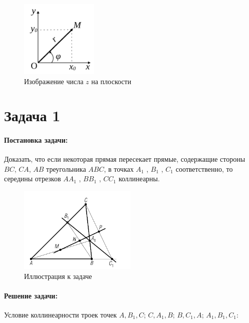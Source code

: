 \begin{figure}[ht]
    \centering
    \includegraphics[width=0.33\textwidth]{images/img1}
    \caption{Изображение числа \(z\) на плоскости}
    \label{img1}
\end{figure}
\section*{Задача 1}
\paragraph{Постановка задачи:}
Доказать, что если некоторая прямая пересекает прямые, содержащие стороны \(BC\), \(CA\), \(AB\) треугольника \(ABC\), в точках \(A_1\) , \(B_1\) , \(C_1\) соответственно, то середины отрезков \(AA_1\) , \(BB_1\) , \(CC_1\) коллинеарны.
\begin{figure}[h]
    \centering
    \includegraphics[width=0.5\textwidth]{images/task1.png}
    \caption{Иллюстрация к задаче}
    \label{task1}
\end{figure}
\paragraph{Решение задачи:}
Условие коллинеарности троек точек \(A, B_1 , C\); \(C,
A_1 , B\); \(B, C_1 , A\); \(A_1 , B_1 , C_1\):

